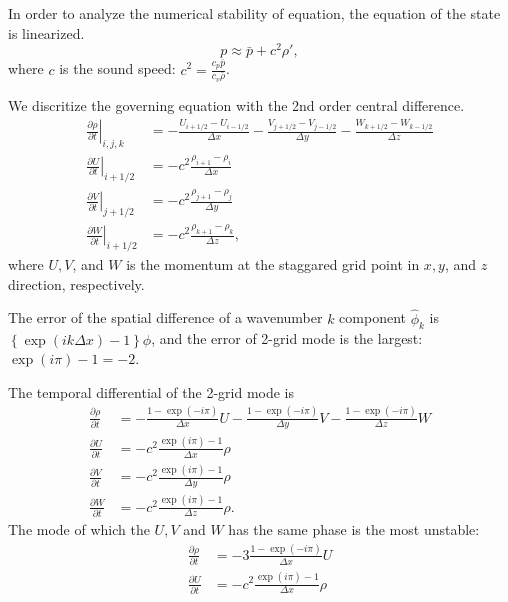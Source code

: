 In order to analyze the numerical stability of equation, the equation of the state is linearized.
\begin{equation}
  p \approx \bar{p} + c^2 \rho',
\end{equation}
where $c$ is the sound speed: $c^2=\frac{c_p\bar{p}}{c_v\bar{\rho}}$.


We discritize the governing equation with the 2nd order central difference.
\begin{align}
  \left. \frac{\partial \rho}{\partial t}\right|_{i,j,k} &=
  -\frac{U_{i+1/2}-U_{i-1/2}}{\Delta x}
  -\frac{V_{j+1/2}-V_{j-1/2}}{\Delta y}
  -\frac{W_{k+1/2}-W_{k-1/2}}{\Delta z} \\
  \left. \frac{\partial U}{\partial t}\right|_{i+1/2} &=
  -c^2\frac{\rho_{i+1}-\rho_i}{\Delta x} \\
  \left. \frac{\partial V}{\partial t}\right|_{j+1/2} &=
  -c^2\frac{\rho_{j+1}-\rho_j}{\Delta y} \\
  \left. \frac{\partial W}{\partial t}\right|_{i+1/2} &=
  -c^2\frac{\rho_{k+1}-\rho_k}{\Delta z},
\end{align}
where $U, V$, and $W$ is the momentum at the staggared grid point in $x, y$, and $z$ direction, respectively.

The error of the spatial difference of a wavenumber $k$ component $\hat{\phi}_k$ is $\left\{\exp(ik\Delta x)-1\right\}\hat{\phi}$, and the error of 2-grid mode is the largest: $\exp(i\pi)-1 = -2$.

The temporal differential of the 2-grid mode is
\begin{align}
  \frac{\partial \rho}{\partial t} &=
  -\frac{1-\exp(-i\pi)}{\Delta x}U
  -\frac{1-\exp(-i\pi)}{\Delta y}V
  -\frac{1-\exp(-i\pi)}{\Delta z}W \\
  \frac{\partial U}{\partial t} &=
  -c^2\frac{\exp(i\pi)-1}{\Delta x}\rho \\
  \frac{\partial V}{\partial t} &=
  -c^2\frac{\exp(i\pi)-1}{\Delta y}\rho \\
  \frac{\partial W}{\partial t} &=
  -c^2\frac{\exp(i\pi)-1}{\Delta z}\rho.
\end{align}
The mode of which the $U, V$ and $W$ has the same phase is the most unstable:
\begin{align}
  \frac{\partial \rho}{\partial t} &=
  -3\frac{1-\exp(-i\pi)}{\Delta x}U \\
  \frac{\partial U}{\partial t} &=
  -c^2\frac{\exp(i\pi)-1}{\Delta x}\rho
\end{align}

